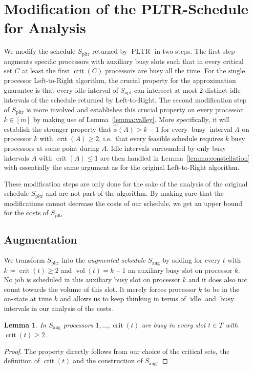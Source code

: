 \documentclass[a4paper]{article}
\DeclareMathOperator{\idle}{idle}
\DeclareMathOperator{\busy}{busy}
\DeclareMathOperator{\opt}{opt}
\DeclareMathOperator{\pltr}{pltr}
\DeclareMathOperator{\PLTR}{PLTR}
\DeclareMathOperator{\aug}{aug}
\DeclareMathOperator{\vol}{vol}
\DeclareMathOperator{\crit}{crit}
\newtheorem{lemma}[theorem]{Lemma}
\begin{document}
\section{Modification of the PLTR-Schedule for Analysis}
We modify the schedule $S_{\pltr}$ returned by $\PLTR$ in two steps.
The first step augments specific processors with auxiliary busy slots such that in every critical set $C$ at least the first $\crit(C)$ processors are busy all the time.
For the single processor Left-to-Right algorithm, the crucial property for the approximation guarantee is that every idle interval of $S_{\opt}$ can intersect at most $2$ distinct idle intervals of the schedule returned by Left-to-Right.
The second modification step of $S_{\pltr}$ is more involved and establishes this crucial property on every processor $k \in [m]$ by making use of Lemma~\ref{lemma:valley}.
More specifically, it will establish the stronger property that $\hat \phi(A) > k - 1$ for every $\busy$ interval $A$ on processor $k$ with $\crit(A) \geq 2$, i.e.\ that every feasible schedule requires $k$ busy processors at some point during $A$.
Idle intervals surrounded by only busy intervals $A$ with $\crit(A) \leq 1$ are then handled in Lemma~\ref{lemma:constellation} with essentially the same argument as for the original Left-to-Right algorithm.

These modification steps are only done for the sake of the analysis of the original schedule $S_{\pltr}$ and are not part of the algorithm.
By making sure that the modifications cannot decrease the costs of our schedule, we get an upper bound for the costs of $S_{\pltr}$.

\subsection{Augmentation}
We transform $S_{\pltr}$ into the \emph{augmented schedule $S_{\aug}$} by adding for every $t$ with $k \coloneqq \crit(t) \geq 2$ and $\vol(t) = k-1$ an auxiliary busy slot on processor $k$.
No job is scheduled in this auxiliary busy slot on processor $k$ and it does also not count towards the volume of this slot.
It merely forces processor $k$ to be in the on-state at time $k$ and allows us to keep thinking in terms of $\idle$ and $\busy$ intervals in our analysis of the costs.

\begin{lemma}\label{lemma:augmented}
  In $S_{\aug}$ processors $1, \ldots, \crit(t)$ are busy in every slot $t \in T$ with $\crit(t) \geq 2$.
\end{lemma}
\begin{proof}
  The property directly follows from our choice of the critical sets, the definition of $\crit(t)$ and the construction of $S_{\aug}$.
\end{proof}
\end{document}
